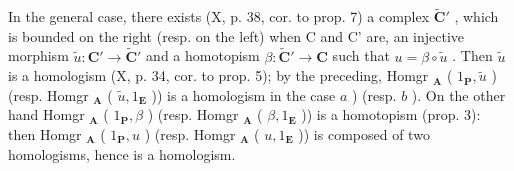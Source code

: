 In the general case, there exists (X, p. 38, cor. to prop. 7) a complex \(\tilde{\mathbf{C}}'\) , which is bounded on the right (resp. on the left) when C and C' are, an injective morphism \(\tilde{u}: \mathbf{C}' \to \tilde{\mathbf{C}}'\) and a homotopism \(\beta: \tilde{\mathbf{C}}' \to \mathbf{C}\) such that \(u = \beta \circ \tilde{u}\) . Then \(\tilde{u}\) is a homologism (X, p. 34, cor. to prop. 5); by the preceding, Homgr \(_{\mathbf{A}}\) ( \(1_{\mathbf{P}}, \tilde{u}\) ) (resp. Homgr \(_{\mathbf{A}}\) ( \(\tilde{u}, 1_{\mathbf{E}}\) )) is a homologism in the case \(a\) ) (resp. \(b\) ). On the other hand Homgr \(_{\mathbf{A}}\) ( \(1_{\mathbf{P}}, \beta\) ) (resp. Homgr \(_{\mathbf{A}}\) ( \(\beta, 1_{\mathbf{E}}\) )) is a homotopism (prop. 3): then Homgr \(_{\mathbf{A}}\) ( \(1_{\mathbf{P}}, u\) ) (resp. Homgr \(_{\mathbf{A}}\) ( \(u, 1_{\mathbf{E}}\) )) is composed of two homologisms, hence is a homologism.

